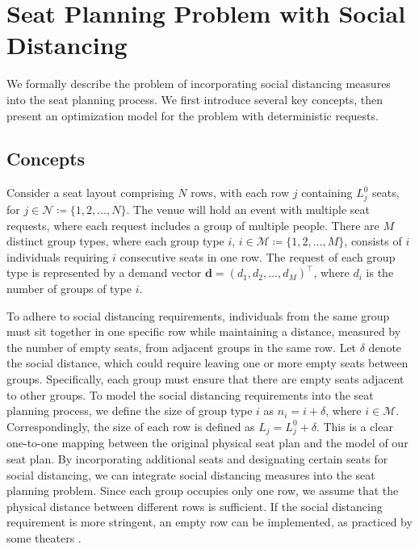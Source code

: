 \section{Seat Planning Problem with Social Distancing}\label{problem_description}
We formally describe the problem of incorporating social distancing measures into the seat planning process. We first introduce several key concepts, then present an optimization model for the problem with deterministic requests.

\subsection{Concepts}
Consider a seat layout comprising $N$ rows, with each row $j$ containing $L_j^0$ seats, for  $j \in \mathcal{N} \coloneqq \{1,2, \ldots, N\}$. The venue will hold an event with multiple seat requests, where each request includes a group of multiple people.
There are $M$ distinct group types, where each group type $i$, $i \in \mathcal{M} \coloneqq \{1, 2, \ldots, M\}$, consists of $i$ individuals requiring $i$ consecutive seats in one row. The request of each group type is represented by a demand vector $\mathbf{d} = (d_1, d_2, \ldots, d_M)^{\intercal}$, where $d_i$ is the number of groups of type $i$.

To adhere to social distancing requirements, individuals from the same group must sit together in one specific row while maintaining a distance, measured by the number of empty seats, from adjacent groups in the same row.
Let $\delta$ denote the social distance, which could require leaving one or more empty seats between groups. Specifically, each group must ensure that there are empty seats adjacent to other groups. To model the social distancing requirements into the seat planning process, we define the size of group type $i$ as $n_i = i + \delta$, where $i \in \mathcal{M}$. Correspondingly, the size of each row is defined as $L_j = L_j^{0} + \delta$. This is a clear one-to-one mapping between the original physical seat plan and the model of our seat plan. By incorporating additional seats and designating certain seats for social distancing, we can integrate social distancing measures into the seat planning problem.
Since each group occupies only one row, we assume that the physical distance between different rows is sufficient. If the social distancing requirement is more stringent, an empty row can be implemented, as practiced by some theaters \citep{Berlin_theater}.

